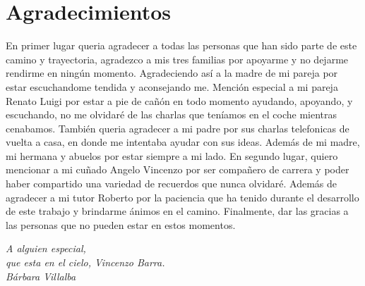 \cleardoublepage

\chapter*{Agradecimientos}

En primer lugar queria agradecer a todas las personas que han sido parte de este camino y trayectoria, agradezco a mis tres familias por apoyarme y no 
dejarme rendirme en ningún momento. Agradeciendo así a la madre de mi pareja por estar escuchandome tendida y aconsejando me. \newline
\newline
Mención especial a mi pareja Renato Luigi por estar a pie de cañón en todo momento ayudando, apoyando, y escuchando, no me olvidaré de las charlas que teníamos
en el coche mientras cenabamos. También queria agradecer a mi padre por sus charlas telefonicas de vuelta a casa, en donde me intentaba ayudar con sus ideas. Además de mi madre,
mi hermana y abuelos por estar siempre a mi lado.\newline
\newline
En segundo lugar, quiero mencionar a mi cuñado Angelo Vincenzo por ser compañero de carrera y poder haber compartido una variedad de recuerdos que nunca olvidaré. \newline
\newline
Además de agradecer a mi tutor Roberto por la paciencia que ha tenido durante el desarrollo de este trabajo y brindarme ánimos en el camino. \newline
\newline
Finalmente, dar las gracias a las personas que no pueden estar en estos momentos.


\begin{flushright}
	\vspace{4.0 cm}
	\emph{A alguien especial,\\
    que esta en el cielo, Vincenzo Barra.}\\
	\emph{Bárbara Villalba}
\end{flushright}

\thispagestyle{empty}


